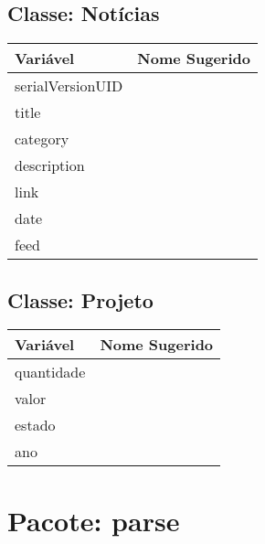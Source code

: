 \documentclass[12pt]{article}
\begin{document}
	\subsection{Classe: Notícias}
		\begin{table}[H]
			\begin{center}
				\begin{tabular}{l | l}
					\toprule
						Variável & Nome Sugerido\\
					\midrule
						serialVersionUID & \\
						title & \\
						category & \\
						description & \\
						link & \\
						date & \\
						feed & \\
					\bottomrule
				\end{tabular}
			\end{center}
		\end{table}

	\subsection{Classe: Projeto}
		\begin{table}[H]
			\begin{center}
				\begin{tabular}{l | l}
					\toprule
						Variável & Nome Sugerido\\
					\midrule
						quantidade & \\
						valor & \\
						estado & \\
						ano & \\
					\bottomrule
				\end{tabular}
			\end{center}
		\end{table}

\newpage
\section{Pacote: parse}
\end{document}
